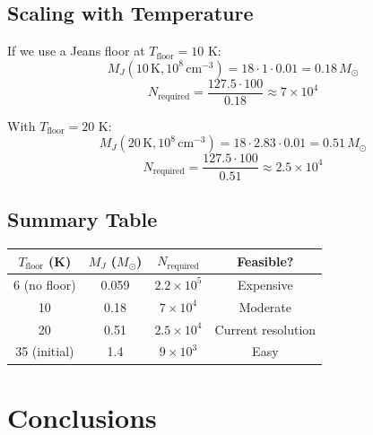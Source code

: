 \documentclass[12pt,a4paper]{article}
\begin{document}
\subsection{Scaling with Temperature}

If we use a Jeans floor at $T_{\text{floor}} = 10$ K:
\begin{equation}
    M_J(10 \, \text{K}, 10^8 \, \text{cm}^{-3}) = 18 \cdot 1 \cdot 0.01 = 0.18 \, M_\odot
\end{equation}
\begin{equation}
    N_{\text{required}} = \frac{127.5 \cdot 100}{0.18} \approx 7 \times 10^4
\end{equation}

With $T_{\text{floor}} = 20$ K:
\begin{equation}
    M_J(20 \, \text{K}, 10^8 \, \text{cm}^{-3}) = 18 \cdot 2.83 \cdot 0.01 = 0.51 \, M_\odot
\end{equation}
\begin{equation}
    N_{\text{required}} = \frac{127.5 \cdot 100}{0.51} \approx 2.5 \times 10^4
\end{equation}

\subsection{Summary Table}

\begin{center}
\begin{tabular}{cccc}
\toprule
$T_{\text{floor}}$ (K) & $M_J$ ($M_\odot$) & $N_{\text{required}}$ & Feasible? \\
\midrule
6 (no floor) & 0.059 & $2.2 \times 10^5$ & Expensive \\
10 & 0.18 & $7 \times 10^4$ & Moderate \\
20 & 0.51 & $2.5 \times 10^4$ & Current resolution \\
35 (initial) & 1.4 & $9 \times 10^3$ & Easy \\
\bottomrule
\end{tabular}
\end{center}

\section{Conclusions}
\end{document}
